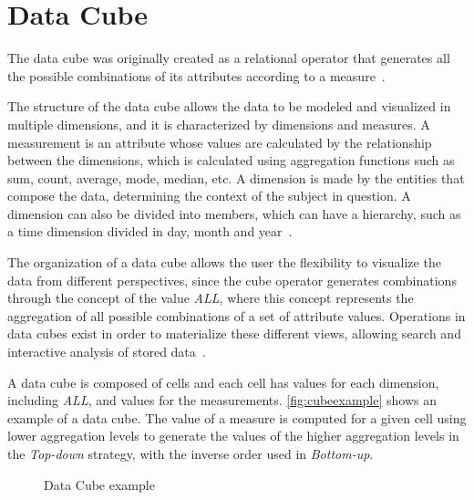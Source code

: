 \section{Data Cube}\label{ch:fun:cube}

The data cube was originally created as a relational operator that generates all the possible combinations of its attributes according to a measure~\cite{grayDataCubeRelational1996}.

The structure of the data cube allows the data to be modeled and visualized in multiple dimensions, and it is characterized by dimensions and measures.
A measurement is an attribute whose values are calculated by the relationship between the dimensions, which is calculated using aggregation functions such as sum, count, average, mode, median, etc.
A dimension is made by the entities that compose the data, determining the context of the subject in question.
A dimension can also be divided into members, which can have a hierarchy, such as a time dimension divided in day, month and year~\cite{hanDataMiningConcepts2011}.

The organization of a data cube allows the user the flexibility to visualize the data from different perspectives, since the cube operator generates combinations through the concept of the value \textit{ALL}, where this concept represents the aggregation of all possible combinations of a set of attribute values.
Operations in data cubes exist in order to materialize these different views, allowing search and interactive analysis of stored data~\cite{hanDataMiningConcepts2011}.

A data cube is composed of cells and each cell has values for each dimension, including \textit{ALL}, and values for the measurements.
\autoref{fig:cubeexample} shows an example of a data cube.
The value of a measure is computed for a given cell using lower aggregation levels to generate the values of the higher aggregation levels in the \textit{Top-down} strategy, with the inverse order used in \textit{Bottom-up}.

\begin{figure}[!htb]
  \caption{Data Cube example}\label{fig:cubeexample}
  \vspace{2mm}
  \begin{center}
  \end{center}
  \vspace{1mm}
  \legenda{}
\end{figure}

